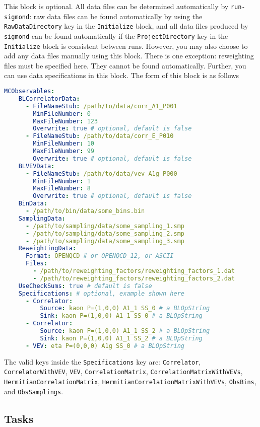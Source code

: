 \documentclass[12pt,letterpaper,notitlepage]{article}
\newcommand{\key}[1]{\textcolor{Emerald}{\texttt{\small{#1}}}}
\newcommand{\runsigmond}{\texttt{run-sigmond}}
\newcommand{\sigmond}{\texttt{sigmond}}
\begin{document}
This block is optional. All data files can be determined automatically by \runsigmond{}:
raw data files can be found automatically by using the \key{RawDataDirectory} key in the \key{Initialize} block,
and all data files produced by \sigmond{} can be found automatically if the \key{ProjectDirectory} key in the \key{Initialize} block is consistent between runs.
However, you may also choose to add any data files manually using this block.
There is one exception: reweighting files must be specified here. They cannot be found automatically.
Further, you can use data specifications in this block.
The form of this block is as follows
\begin{lstlisting}[language=yaml]
  MCObservables:
    BLCorrelatorData: 
      - FileNameStub: /path/to/data/corr_A1_P001
        MinFileNumber: 0
        MaxFileNumber: 123
        Overwrite: true # optional, default is false
      - FileNameStub: /path/to/data/corr_E_P010
        MinFileNumber: 10
        MaxFileNumber: 99
        Overwrite: true # optional, default is false
    BLVEVData:
      - FileNameStub: /path/to/data/vev_A1g_P000
        MinFileNumber: 1
        MaxFileNumber: 8
        Overwrite: true # optional, default is false
    BinData: 
      - /path/to/bin/data/some_bins.bin
    SamplingData:
      - /path/to/sampling/data/some_sampling_1.smp
      - /path/to/sampling/data/some_sampling_2.smp
      - /path/to/sampling/data/some_sampling_3.smp
    ReweightingData:
      Format: OPENQCD # or OPENQCD_12, or ASCII
      Files:
        - /path/to/reweighting_factors/reweighting_factors_1.dat
        - /path/to/reweighting_factors/reweighting_factors_2.dat
    UseCheckSums: true # default is false
    Specifications: # optional, example shown here
      - Correlator:
          Source: kaon P=(1,0,0) A1_1 SS_0 # a BLOpString
          Sink: kaon P=(1,0,0) A1_1 SS_0 # a BLOpString
      - Correlator:
          Source: kaon P=(1,0,0) A1_1 SS_2 # a BLOpString
          Sink: kaon P=(1,0,0) A1_1 SS_2 # a BLOpString
      - VEV: eta P=(0,0,0) A1g SS_0 # a BLOpString
\end{lstlisting}
The valid keys inside the \key{Specifications} key are:
\key{Correlator}, \key{CorrelatorWithVEV}, \key{VEV}, \key{CorrelationMatrix}, \key{CorrelationMatrixWithVEVs},
\key{HermitianCorrelationMatrix}, \key{HermitianCorrelationMatrixWithVEVs}, \key{ObsBins}, and \key{ObsSamplings}.

\subsection{Tasks}
\label{subsec:tasks}
\end{document}
